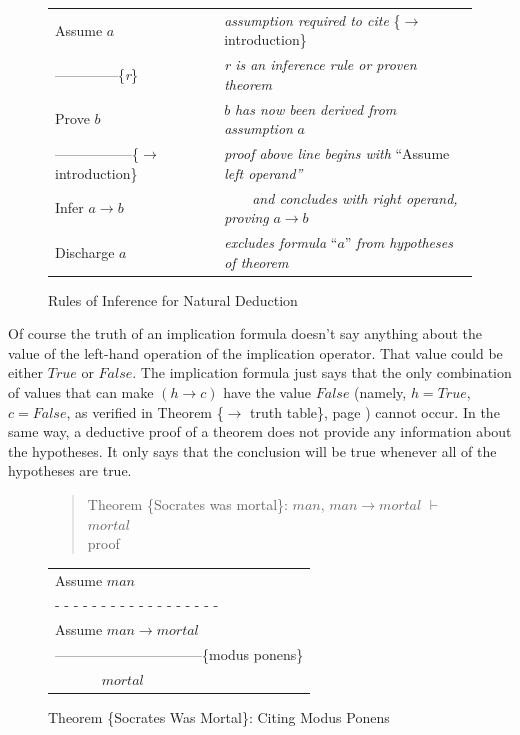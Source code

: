 \begin{figure}
\begin{center}
\begin{tabular}{ll}
Assume $a$                                      & \emph{assumption required to cite} \{$\rightarrow$ introduction\}     \\
--------------\{\emph{r}\}                      & \emph{r is an inference rule or proven theorem}                       \\
Prove $b$                                       & $b$ \emph{has now been derived from assumption} $a$                   \\
-----------------\{$\rightarrow$ introduction\} & \emph{proof above line begins with} ``Assume \emph{left operand''}    \\
Infer $a \rightarrow b$                         & ~~~~\emph{and concludes with right operand, proving} $a \rightarrow b$\\
Discharge $a$                                   & \emph{excludes formula} ``$a$'' \emph{from hypotheses of theorem}     \\
\end{tabular}
\end{center}
\caption{Rules of Inference for Natural Deduction}
\label{fig-02-deduction-rules}
\end{figure}

Of course the truth of an implication formula doesn't
say anything about the value of the
left-hand operation of the implication operator.
That value could be either $True$ or $False$.
The implication formula just says that
the only combination of values that can make
$(h \rightarrow c)$ have the value $False$
(namely, $h = True$, $c = False$, as verified in
Theorem \{$\rightarrow$ truth table\},
page \pageref{implication-truth-table}) cannot occur.
In the same way, a deductive proof of a theorem
does not provide any information about the hypotheses.
It only says that the conclusion will be true
whenever all of the hypotheses are true.

\begin{figure}
\begin{quote}
Theorem \{Socrates was mortal\}: $man$, $man \rightarrow mortal$ $\vdash$ $mortal$ \\
proof
\end{quote}
\begin{center}
\begin{tabular}{l}
Assume $man$                    \\
 - - - - - - - - - - - - - - - - - -\\
Assume $man \rightarrow mortal$ \\
--------------------------------\{modus ponens\} \\
~~~~~~ $mortal$                 \\
\end{tabular}
\end{center}
\caption{Theorem \{Socrates Was Mortal\}: Citing Modus Ponens}
\label{fig:socrates-proof}
\end{figure}

